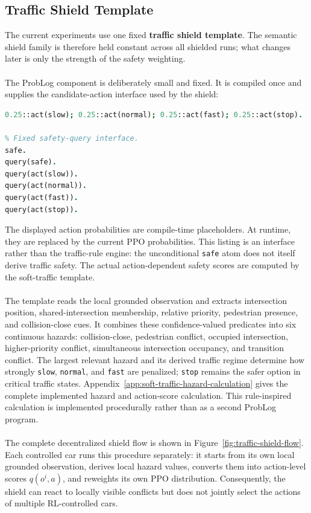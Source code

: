\subsection{Traffic Shield Template}
The current experiments use one fixed \textbf{traffic shield template}. The semantic shield family is therefore held constant across all shielded runs; what changes later is only the strength of the safety weighting.
\\
\\
The ProbLog component is deliberately small and fixed. It is compiled once and supplies the candidate-action interface used by the shield:
\begin{lstlisting}[style=mystyle,language=Prolog,caption={Fixed ProbLog interface of the implemented shield.},label={lst:traffic-shield-skeleton}]
% Compiled once; policy probabilities replace 0.25 at runtime.
0.25::act(slow); 0.25::act(normal); 0.25::act(fast); 0.25::act(stop).

% Fixed safety-query interface.
safe.
query(safe).
query(act(slow)).
query(act(normal)).
query(act(fast)).
query(act(stop)).
\end{lstlisting}
\noindent The displayed action probabilities are compile-time placeholders. At runtime, they are replaced by the current PPO probabilities. This listing is an interface rather than the traffic-rule engine: the unconditional \texttt{safe} atom does not itself derive traffic safety. The actual action-dependent safety scores are computed by the soft-traffic template.
\\
\\
The template reads the local grounded observation and extracts intersection position, shared-intersection membership, relative priority, pedestrian presence, and collision-close cues. It combines these confidence-valued predicates into six continuous hazards: collision-close, pedestrian conflict, occupied intersection, higher-priority conflict, simultaneous intersection occupancy, and transition conflict. The largest relevant hazard and its derived traffic regime determine how strongly \texttt{slow}, \texttt{normal}, and \texttt{fast} are penalized; \texttt{stop} remains the safer option in critical traffic states. Appendix~\ref{app:soft-traffic-hazard-calculation} gives the complete implemented hazard and action-score calculation. This rule-inspired calculation is implemented procedurally rather than as a second ProbLog program.
\\
\\
The complete decentralized shield flow is shown in Figure~\ref{fig:traffic-shield-flow}. Each controlled car runs this procedure separately: it starts from its own local grounded observation, derives local hazard values, converts them into action-level scores \(q(o^i,a)\), and reweights its own PPO distribution. Consequently, the shield can react to locally visible conflicts but does not jointly select the actions of multiple RL-controlled cars.

